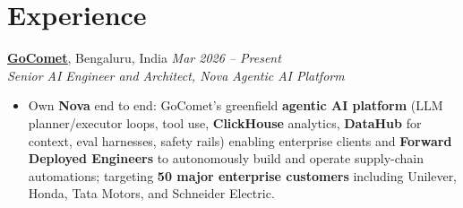 \documentclass[11pt,letterpaper]{article}
\let\oldhref\href
\renewcommand{\href}[2]{\oldhref{#1}{\uline{#2}}}
\begin{document}
\section{Experience}

\textbf{\href{https://www.gocomet.com/}{GoComet}}, Bengaluru, India \hfill \textit{Mar 2026 -- Present}\\
\textit{Senior AI Engineer and Architect, Nova Agentic AI Platform}
\begin{itemize}
\item Own \textbf{Nova} end to end: GoComet's greenfield \textbf{agentic AI platform} (LLM planner/executor loops, tool use, \textbf{ClickHouse} analytics, \textbf{DataHub} for context, eval harnesses, safety rails) enabling enterprise clients and \textbf{Forward Deployed Engineers} to autonomously build and operate supply-chain automations; targeting \textbf{50 major enterprise customers} including Unilever, Honda, Tata Motors, and Schneider Electric.
\end{itemize}
\end{document}
